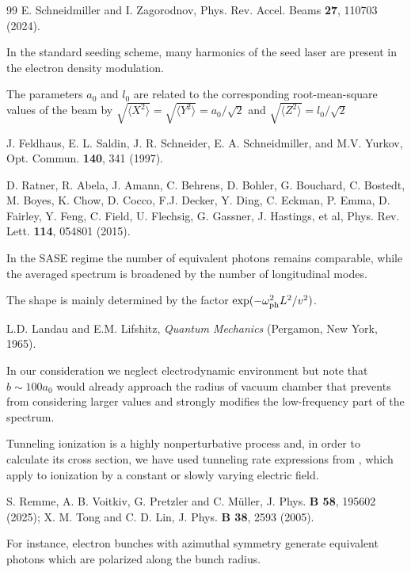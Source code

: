 \documentclass[prl, twocolumn, floatfix]{revtex4}
\begin{document}
\begin{thebibliography}{99}
 E. Schneidmiller and I. Zagorodnov,
Phys. Rev. Accel. Beams {\bf 27}, 110703 (2024).

 In the standard seeding scheme,
many harmonics of the seed laser are present in the electron density modulation.

 The parameters $a_0$ and $l_0$ are related to
the corresponding root-mean-square values of the beam by $ \sqrt{ \langle X^2 \rangle  } = \sqrt{ \langle Y^2 \rangle } = a_0/\sqrt{2} $ and $ \sqrt{ \langle Z^2 \rangle  } = l_0/\sqrt{2} $


  J. Feldhaus, E. L. Saldin, J. R. Schneider,
E. A. Schneidmiller, and M.V. Yurkov, Opt. Commun. {\bf 140}, 341 (1997).

 D. Ratner, R. Abela, J. Amann, C. Behrens, D. Bohler, G. Bouchard, C. Bostedt, M. Boyes, K. Chow, D. Cocco, F.J. Decker, Y. Ding, C. Eckman,
P. Emma, D. Fairley, Y. Feng, C. Field, U. Flechsig,
G. Gassner, J. Hastings, et al, Phys. Rev. Lett. {\bf 114}, 054801 (2015).

 In the SASE regime the
number of equivalent photons remains comparable,
while the averaged spectrum is broadened by
the number of longitudinal modes.

 The shape is mainly determined by
the factor $ \exp( - \omega^2_{\rm ph} L^2/ v^2) $.

 L.D. Landau and E.M. Lifshitz, {\it Quantum Mechanics}
(Pergamon, New York, 1965).

 In our consideration we neglect electrodynamic environment
but note that $b \sim 100 a_0$ would already approach the radius of vacuum chamber
that prevents from considering larger values and strongly modifies
the low-frequency part of the spectrum.

  Tunneling ionization is a highly nonperturbative process and,
in order to calculate its cross section,
we have used tunneling rate expressions from \cite{tun2},
which apply to ionization by a constant or slowly varying electric field.

 S. Remme, A. B. Voitkiv, G. Pretzler and C. M\"uller,
J. Phys. {\bf B 58}, 195602 (2025);
X. M. Tong and C. D. Lin, J. Phys. {\bf B 38}, 2593 (2005).

 For instance, electron bunches with azimuthal symmetry
generate equivalent photons which are polarized along the bunch radius.


\end{thebibliography}
\end{document}
